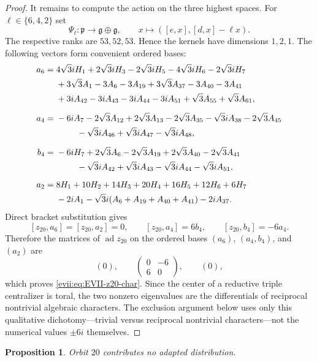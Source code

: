 \documentclass[11pt,reqno]{amsart}
\numberwithin{equation}{section}
\newtheorem{proposition}[theorem]{Proposition}
\theoremstyle{definition}
\theoremstyle{remark}
\newcommand{\ad}{\operatorname{ad}}
\newcommand{\fg}{\mathfrak g}
\newcommand{\fp}{\mathfrak p}
\begin{document}
\begin{proof}
It remains to compute the action on the three highest spaces.  For
$\ell\in\{6,4,2\}$ set
\[
 \Psi_\ell:\fp\longrightarrow\fg\oplus\fg,
 \qquad x\longmapsto([e,x],[d,x]-\ell x).
\]
The respective ranks are $53,52,53$.  Hence the kernels have dimensions
$1,2,1$.  The following vectors form convenient ordered bases:
\begingroup
\small
\begin{align*}
 a_6={}&4\sqrt3iH_1+2\sqrt3iH_3-2\sqrt3iH_5
        -4\sqrt3iH_6-2\sqrt3iH_7\\
 &+3\sqrt3A_1-3A_6-3A_{19}+3\sqrt3A_{37}-3A_{40}-3A_{41}\\
 &+3iA_{42}-3iA_{43}-3iA_{44}-3iA_{51}
   +\sqrt3A_{55}+\sqrt3A_{61},\\[2mm]
 a_4={}&-6iA_7-2\sqrt3A_{12}+2\sqrt3A_{13}-2\sqrt3A_{35}
        -\sqrt3iA_{38}-2\sqrt3A_{45}\\
 &\hspace{2.4em}-\sqrt3iA_{46}+\sqrt3iA_{47}-\sqrt3iA_{48},\\[2mm]
 b_4={}&-6iH_7+2\sqrt3A_6-2\sqrt3A_{19}
        +2\sqrt3A_{40}-2\sqrt3A_{41}\\
 &\hspace{2.4em}-\sqrt3iA_{42}+\sqrt3iA_{43}
        -\sqrt3iA_{44}-\sqrt3iA_{51},\\[2mm]
 a_2={}&8H_1+10H_2+14H_3+20H_4+16H_5+12H_6+6H_7\\
 &-2iA_1-\sqrt3i(A_6+A_{19}+A_{40}+A_{41})-2iA_{37}.
\end{align*}
\endgroup
Direct bracket substitution gives
\[
 [z_{20},a_6]=[z_{20},a_2]=0,
 \qquad
 [z_{20},a_4]=6b_4,
 \qquad
 [z_{20},b_4]=-6a_4.
\]
Therefore the matrices of $\ad z_{20}$ on the ordered bases
$(a_6)$, $(a_4,b_4)$, and $(a_2)$ are
\[
 (0),\qquad
 \begin{pmatrix}0&-6\\6&0\end{pmatrix},\qquad
 (0),
\]
which proves \eqref{evii:eq:EVII-z20-char}.  Since the center of a reductive
triple centralizer is toral, the two nonzero eigenvalues are the differentials
of reciprocal nontrivial algebraic characters.  The exclusion argument below
uses only this qualitative dichotomy---trivial versus reciprocal nontrivial
characters---not the numerical values $\pm6i$ themselves.
\end{proof}

\begin{proposition}\label{evii:prop:EVII-orbit20}
Orbit $20$ contributes no adapted distribution.
\end{proposition}
\end{document}
